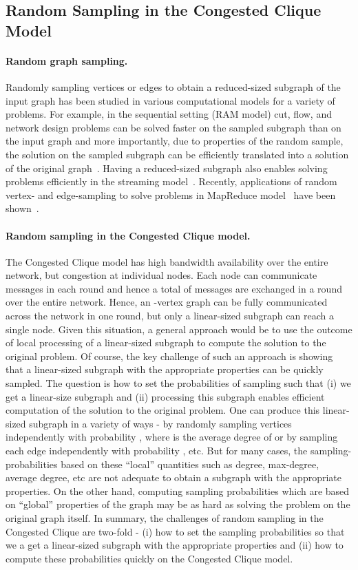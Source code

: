 \documentclass[11pt]{article}
\begin{document}
\subsection{Random Sampling in the Congested Clique Model}
\paragraph{Random graph sampling.} 
Randomly sampling vertices or edges to obtain a reduced-sized subgraph of the input graph has been studied in various computational models for a variety of problems. 
For example, in the sequential setting (RAM model) cut, flow, and network design problems can be solved faster on the sampled subgraph than on the input graph and 
more importantly, due to properties of the random sample, the solution on the sampled subgraph can be efficiently translated into a solution of the original graph~\cite{karger1994stoc, benczurKarger1996stoc, fung2011stoc}. 
Having a reduced-sized subgraph also enables solving problems efficiently in the streaming model~\cite{ahn2009streaming}.
Recently, applications of random vertex- and edge-sampling to solve problems in MapReduce model~\cite{KarloffSuriVassilvitskii} have been shown~\cite{lattanzi2011filtering}. 


\paragraph{Random sampling in the Congested Clique model.}
The Congested Clique model has high bandwidth availability over the entire network, but congestion at individual nodes.
Each node can communicate  messages in each round and hence a total of  messages are exchanged in a round over the entire network. 
Hence, an -vertex graph can be fully communicated across the network in one round, but only a linear-sized subgraph can reach a single node. 
Given this situation, a general approach would be to use the outcome of local processing of a linear-sized subgraph to compute the solution to the original problem.  
Of course, the key challenge of such an approach is showing that a linear-sized subgraph with the appropriate properties can be quickly sampled. 
The question is how to set the probabilities of sampling such that (i) we get a linear-size subgraph and (ii) processing this subgraph enables efficient computation of the solution to the original problem. 
One can produce this linear-sized subgraph in a variety of ways - 
by randomly sampling vertices independently with probability , where  is the average degree of  or 
by sampling each edge independently with probability  , etc. 
But for many cases, the sampling-probabilities based on these ``local'' quantities such as degree, max-degree, average degree, etc are not adequate to obtain a subgraph with the appropriate properties. 
On the other hand, computing sampling probabilities which are based on ``global'' properties of the graph may be as hard as solving the problem on the original graph itself. 
In summary, the challenges of random sampling in the Congested Clique are two-fold - 
(i) how to set the sampling probabilities so that we a get a linear-sized subgraph with the appropriate properties and (ii) how to compute these probabilities quickly on the Congested Clique model. 
\end{document}
